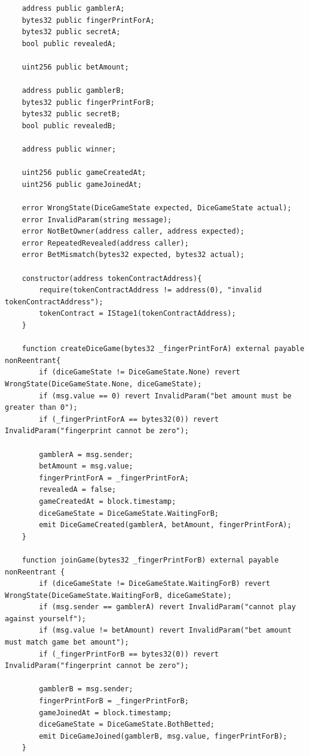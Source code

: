 \documentclass[10pt,a4paper]{article}
\begin{document}
\begin{lstlisting}
    address public gamblerA;
    bytes32 public fingerPrintForA;
    bytes32 public secretA;
    bool public revealedA;

    uint256 public betAmount;

    address public gamblerB;
    bytes32 public fingerPrintForB;
    bytes32 public secretB;
    bool public revealedB;

    address public winner;
    
    uint256 public gameCreatedAt;
    uint256 public gameJoinedAt;

    error WrongState(DiceGameState expected, DiceGameState actual);
    error InvalidParam(string message);
    error NotBetOwner(address caller, address expected);
    error RepeatedRevealed(address caller);
    error BetMismatch(bytes32 expected, bytes32 actual);

    constructor(address tokenContractAddress){
        require(tokenContractAddress != address(0), "invalid tokenContractAddress");
        tokenContract = IStage1(tokenContractAddress);
    }

    function createDiceGame(bytes32 _fingerPrintForA) external payable nonReentrant{
        if (diceGameState != DiceGameState.None) revert WrongState(DiceGameState.None, diceGameState);
        if (msg.value == 0) revert InvalidParam("bet amount must be greater than 0");
        if (_fingerPrintForA == bytes32(0)) revert InvalidParam("fingerprint cannot be zero");

        gamblerA = msg.sender;
        betAmount = msg.value;
        fingerPrintForA = _fingerPrintForA;
        revealedA = false;
        gameCreatedAt = block.timestamp;
        diceGameState = DiceGameState.WaitingForB;
        emit DiceGameCreated(gamblerA, betAmount, fingerPrintForA);
    }

    function joinGame(bytes32 _fingerPrintForB) external payable nonReentrant {
        if (diceGameState != DiceGameState.WaitingForB) revert WrongState(DiceGameState.WaitingForB, diceGameState);
        if (msg.sender == gamblerA) revert InvalidParam("cannot play against yourself");
        if (msg.value != betAmount) revert InvalidParam("bet amount must match game bet amount");
        if (_fingerPrintForB == bytes32(0)) revert InvalidParam("fingerprint cannot be zero");
      
        gamblerB = msg.sender;
        fingerPrintForB = _fingerPrintForB;
        gameJoinedAt = block.timestamp;
        diceGameState = DiceGameState.BothBetted;
        emit DiceGameJoined(gamblerB, msg.value, fingerPrintForB);
    }


\end{lstlisting}
\end{document}
